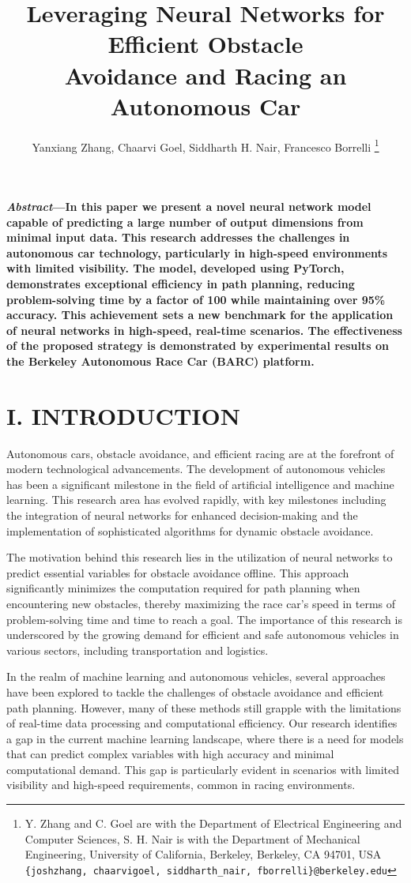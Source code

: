 \documentclass[
	letterpaper, %
	10pt, %
	unnumberedsections, %
	twoside, %
]{LTJournalArticle}
\title{Leveraging Neural Networks for Efficient Obstacle\\Avoidance and Racing an Autonomous Car}
\author{Yanxiang Zhang, Chaarvi Goel, Siddharth H. Nair, Francesco Borrelli
\thanks{\;Y. Zhang and C. Goel are with the Department of Electrical Engineering and Computer Sciences, S. H. Nair is with the Department of Mechanical Engineering, University of California, Berkeley, Berkeley, CA 94701, USA \texttt{\{joshzhang, chaarvigoel, siddharth\_nair, fborrelli\}@berkeley.edu}}}
\date{}    %
\begin{document}
\maketitle %


\textbf{\small\textit{Abstract}---In this paper we present a novel neural network model capable of predicting a large number of output dimensions from minimal input data. This research addresses the challenges in autonomous car technology, particularly in high-speed environments with limited visibility. The model, developed using PyTorch, demonstrates exceptional efficiency in path planning, reducing problem-solving time by a factor of 100 while maintaining over 95\% accuracy. This achievement sets a new benchmark for the application of neural networks in high-speed, real-time scenarios. The effectiveness of the proposed strategy is demonstrated by experimental results on the Berkeley Autonomous Race Car (BARC) platform.}

\section{I. INTRODUCTION}

Autonomous cars, obstacle avoidance, and efficient racing are at the forefront of modern technological advancements. The development of autonomous vehicles has been a significant milestone in the field of artificial intelligence and machine learning. This research area has evolved rapidly, with key milestones including the integration of neural networks for enhanced decision-making and the implementation of sophisticated algorithms for dynamic obstacle avoidance.

The motivation behind this research lies in the utilization of neural networks to predict essential variables for obstacle avoidance offline. This approach significantly minimizes the computation required for path planning when encountering new obstacles, thereby maximizing the race car's speed in terms of problem-solving time and time to reach a goal. The importance of this research is underscored by the growing demand for efficient and safe autonomous vehicles in various sectors, including transportation and logistics.

In the realm of machine learning and autonomous vehicles, several approaches have been explored to tackle the challenges of obstacle avoidance and efficient path planning. However, many of these methods still grapple with the limitations of real-time data processing and computational efficiency. Our research identifies a gap in the current machine learning landscape, where there is a need for models that can predict complex variables with high accuracy and minimal computational demand. This gap is particularly evident in scenarios with limited visibility and high-speed requirements, common in racing environments.
\end{document}
